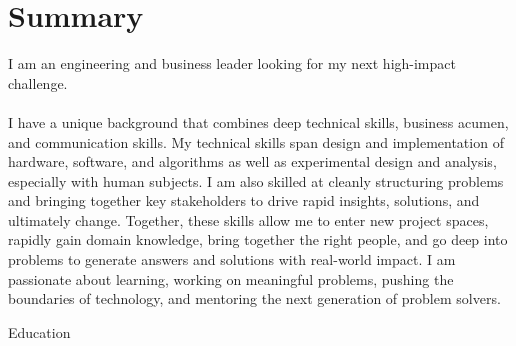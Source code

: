 \documentclass[10pt, letter]{article}
\begin{document}


\section*{Summary}
\hspace*{\fill}\begin{minipage}{\textwidth-\cvindent}
    I am an engineering and business leader looking for my next high-impact challenge.
    \\
    \\
    I have a unique background that combines deep technical skills, business acumen, and communication skills.
    My technical skills span design and implementation of hardware, software, and algorithms as well as experimental design and analysis, especially with human subjects.
    I am also skilled at cleanly structuring problems and bringing together key stakeholders to drive rapid insights, solutions, and ultimately change.
    Together, these skills allow me to enter new project spaces, rapidly gain domain knowledge, bring together the right people, and go deep into problems to generate answers and solutions with real-world impact.
    I am passionate about learning, working on meaningful problems, pushing the boundaries of technology, and mentoring the next generation of problem solvers.


\end{minipage}

\begin{cvsection}{Education}




\end{cvsection}
\end{document}
